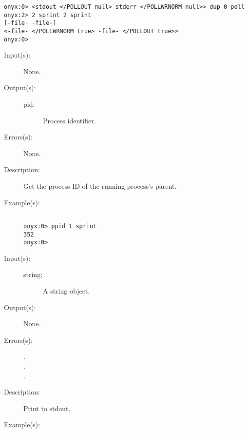 \begin{description}
\begin{description}
\begin{verbatim}
onyx:0> <stdout </POLLOUT null> stderr </POLLWRNORM null>> dup 0 poll
onyx:2> 2 sprint 2 sprint
[-file- -file-]
<-file- </POLLWRNORM true> -file- </POLLOUT true>>
onyx:0>
		\end{verbatim}
	\end{description}
\label{systemdict:ppid}
\item[{\onyxop{--}{ppid}{pid}}: ]
	\begin{description}\item[]
	\item[Input(s): ] None.
	\item[Output(s): ]
		\begin{description}\item[]
		\item[pid: ]
			Process identifier.
		\end{description}
	\item[Errors(s): ] None.
	\item[Description: ]
		Get the process ID of the running process's parent.
	\item[Example(s): ]\begin{verbatim}

onyx:0> ppid 1 sprint
352
onyx:0>
		\end{verbatim}
	\end{description}
\label{systemdict:print}
\item[{\onyxop{string}{print}{--}}: ]
	\begin{description}\item[]
	\item[Input(s): ]
		\begin{description}\item[]
		\item[string: ]
			A string object.
		\end{description}
	\item[Output(s): ] None.
	\item[Errors(s): ]
		\begin{description}\item[]
		\item[.]
		\item[.]
		\item[.]
		\end{description}
	\item[Description: ]
		Print  to stdout.
	\item[Example(s): ]\begin{verbatim}


\end{verbatim}
\end{description}
\end{description}
